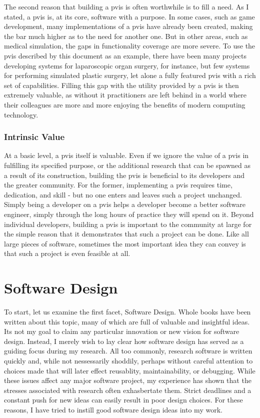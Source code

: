 \documentclass[12pt,oneside,letterpaper]{memoir}
\begin{document}
The second reason that building a \gls{pvis} is often worthwhile is to fill
a need. As I stated, a \gls{pvis} is, at its core, software with a
purpose. In some cases, such as game development, many implementations
of a \gls{pvis} have already been created, making the bar much higher as to
the need for another one. But in other areas, such as medical
simulation, the gaps in functionality coverage are more severe. To use
the \gls{pvis} described by this document as an example, there have been
many projects developing systems for laparoscopic organ surgery, for
instance, but few systems for performing simulated plastic surgery,
let alone a fully featured \gls{pvis} with a rich set of
capabilities. Filling this gap with the utility provided by a \gls{pvis} is
then extremely valuable, as without it practitioners are left behind in
a world where their colleagues are more and more enjoying the benefits
of modern computing technology.

\subsubsection{Intrinsic Value}

At a basic level, a \gls{pvis} itself is valuable. Even if we ignore the
value of a \gls{pvis} in fulfilling its specified purpose, or the additional
research that can be spawned as a result of its construction, building
the \gls{pvis} is beneficial to its developers and the greater
community. For the former, implementing a \gls{pvis} requires time,
dedication, and skill - but no one enters and leaves such a project
unchanged. Simply being a developer on a \gls{pvis} helps a developer become
a better software engineer, simply through the long hours of practice
they will spend on it. Beyond individual developers, building a \gls{pvis}
is important to the community at large for the simple reason that it
demonstrates that such a project can be done. Like all large pieces of
software, sometimes the most important idea they can convey is that such a project is
even feasible at all.

\section{Software Design}

To start, let us examine the first facet, Software Design. Whole books have
been written about this topic, many of which are full of valuable and
insightful ideas. Its not my goal to claim any particular innovation
or new vision for software design. Instead, I merely wish to lay clear
how software design has served as a guiding focus during my
research. All too commonly, research software is written quickly and,
while not nessessarily shoddily, perhaps without careful attention to
choices made that will later effect reusablity, maintainability, or
debugging. While these issues affect any major software project, my
experience has shown that the stresses associated with research often
exhasbertate them. Strict deadlines and a constant push for new ideas
can easily result in poor design choices. For these reasons, I have
tried to instill good software design ideas into my work.
\end{document}
